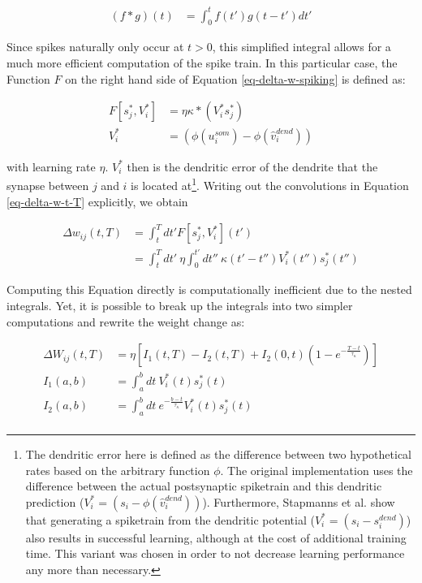 \begin{align}
  (f \ast g)(t) & = \int_{0}^{t} f(t') g(t-t') d t'
\end{align}

Since spikes naturally only occur at $t>0$, this simplified integral allows for a much more efficient computation of the
spike train. In this particular case, the Function $F$ on the right hand side of Equation \ref{eq-delta-w-spiking} is
defined as:

\begin{align}
  F[s_j^\ast, V_i^\ast] & = \eta \kappa \ast (V_i^\ast s_j^\ast)        \\
  V_i^\ast              & = (\phi(u_i^{som}) - \phi(\hat{v}_i^{dend}) )
\end{align}

 with learning rate $\eta$.
$V_i^\ast$ then is the dendritic error of the dendrite that the synapse between $j$ and $i$ is located at\footnote{The
dendritic error here is defined as the difference between two hypothetical rates based on the arbitrary function $\phi$.
The original implementation uses the difference between the actual postsynaptic spiketrain and this dendritic prediction
($V_i^\ast = (s_i - \phi(\hat{v}_i^{dend}) )$). Furthermore, Stapmanns et al. show that generating a spiketrain from the
dendritic potential ($V_i^\ast = (s_i - s_i^{dend})$) also results in successful learning, although at the cost of
additional training time. This variant was chosen in order to not decrease learning performance any more than
necessary.}. Writing out the convolutions in Equation \ref{eq-delta-w-t-T} explicitly, we obtain

\begin{align}
  \Delta w_{ij}(t,T) & = \int_t^T dt' F[s_j^\ast, V_i^\ast](t')                                                                           \\
                     & =  \int_t^T dt' \  \eta\int_0^{t'} dt'' \ \kappa(t'-t'') V_i^\ast (t'') s_j^\ast (t'') \label{eq-delta-w-t-T-long}
\end{align}

Computing this Equation directly is computationally inefficient due to the nested integrals. Yet, it is possible to
break up the integrals into two simpler computations and rewrite the weight change as:


\begin{align}
  \Delta W_{ij}(t, T) & = \eta \left[ I_1 (t, T) - I_2(t,T) + I_2(0,t)\left( 1- e^{-\frac{T-t}{\tau_\kappa}} \right) \right] \\
  I_1(a, b)           & = \int_{a}^{b} dt \ V_i^\ast (t) s_j^\ast (t)                                                        \\
  I_2(a, b)           & = \int_{a}^{b} dt \ e^{-\frac{b-t}{\tau_\kappa}} V_i^\ast (t) s_j^\ast (t)                           \\
\end{align}

